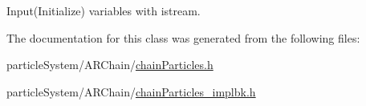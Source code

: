 Input(\+Initialize) variables with istream. 



The documentation for this class was generated from the following files\+:\begin{DoxyCompactItemize}
\item 
particle\+System/\+A\+R\+Chain/\mbox{\hyperlink{chain_particles_8h}{chain\+Particles.\+h}}\item 
particle\+System/\+A\+R\+Chain/\mbox{\hyperlink{chain_particles__implbk_8h}{chain\+Particles\+\_\+implbk.\+h}}\end{DoxyCompactItemize}
